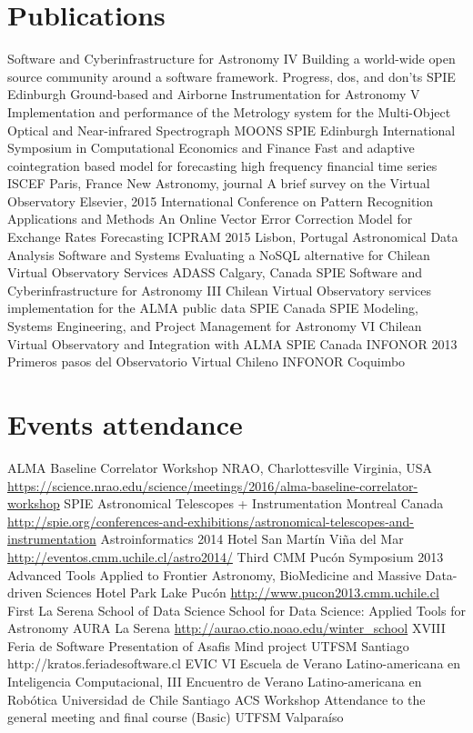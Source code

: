 \documentclass[11pt,a4paper]{moderncv}
\begin{document}
\section{Publications}
	{Software and Cyberinfrastructure for Astronomy IV}
	{Building a world-wide open source community around a software framework. Progress, dos, and don'ts}
	{SPIE}
	{Edinburgh}
	{}
	{Ground-based and Airborne Instrumentation for Astronomy V}
	{Implementation and performance of the Metrology system for the Multi-Object Optical and Near-infrared Spectrograph MOONS}
	{SPIE}
	{Edinburgh}
	{}
	{International Symposium in Computational Economics and Finance}
	{Fast and adaptive cointegration based model for forecasting high frequency financial time series}
	{ISCEF}
	{Paris, France}
	{}
	{New Astronomy, journal}
	{A brief survey on the Virtual Observatory}
	{Elsevier, 2015}
	{}
	{}
	{International Conference on Pattern Recognition Applications and Methods}
	{An Online Vector Error Correction Model for Exchange Rates Forecasting}
	{ICPRAM 2015}
	{Lisbon, Portugal}
	{}
	{Astronomical Data Analysis Software and Systems }
	{Evaluating a NoSQL alternative for Chilean Virtual Observatory Services}
	{ADASS}
	{Calgary, Canada}
	{}
	{SPIE Software and Cyberinfrastructure for Astronomy III}
	{Chilean Virtual Observatory services implementation for the ALMA public data}
	{SPIE}
	{Canada}
	{}
	{SPIE Modeling, Systems Engineering, and Project Management for Astronomy VI}
	{Chilean Virtual Observatory and Integration with ALMA}
	{SPIE}
	{Canada}
	{}
	{INFONOR 2013}
	{Primeros pasos del Observatorio Virtual Chileno}
	{INFONOR}
	{Coquimbo}
	{}

\section{Events attendance}
	{ALMA Baseline Correlator Workshop}
	{}
	{NRAO, Charlottesville}
	{Virginia, USA}
	{\url{https://science.nrao.edu/science/meetings/2016/alma-baseline-correlator-workshop}}
	{SPIE Astronomical Telescopes + Instrumentation}
	{}
	{Montreal}
	{Canada}
	{\url{http://spie.org/conferences-and-exhibitions/astronomical-telescopes-and-instrumentation}}
	{Astroinformatics 2014}
	{}
	{Hotel San Martín}
	{Viña del Mar}
	{\url{http://eventos.cmm.uchile.cl/astro2014/}}
	{Third CMM Pucón Symposium 2013}
	{Advanced Tools Applied to Frontier Astronomy, BioMedicine and Massive Data-driven Sciences}
	{Hotel Park Lake}
	{Pucón}
	{\url{http://www.pucon2013.cmm.uchile.cl}}
	{First La Serena School of Data Science}
	{School for Data Science: Applied Tools for Astronomy}
	{AURA}
	{La Serena}
	{\url{http://aurao.ctio.noao.edu/winter_school}}
	{XVIII Feria de Software}
	{Presentation of Asafis Mind project}
	{UTFSM}
	{Santiago}
	{http://kratos.feriadesoftware.cl}
	{EVIC}
	{VI Escuela de Verano Latino-americana en Inteligencia Computacional, III Encuentro de Verano Latino-americana en Robótica}
	{Universidad de Chile}
	{Santiago}
	{}
	{ACS Workshop}
	{Attendance to the general meeting and final course (Basic)}
	{UTFSM}
	{Valparaíso}
	{}
\end{document}
